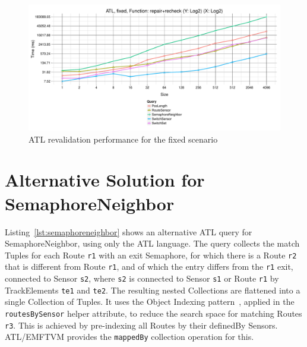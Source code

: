 \documentclass[submission,copyright,creativecommons]{eptcs}
\begin{document}
\begin{figure}[ht]
\centerline{
\includegraphics[width=15cm]{figures/fixed-ATL-GroupBy-Query-time-revalidation}}
\caption{ATL revalidation performance for the fixed scenario}
\label{fig:atl-recheck-performance}
\end{figure}


\appendix

\section{Alternative Solution for SemaphoreNeighbor}
\label{appendix:a}

Listing~\ref{lst:semaphoreneighbor} shows an alternative ATL query for SemaphoreNeighbor, using only the ATL language. The query collects the match Tuples for each Route \texttt{r1} with an exit Semaphore, for which there is a Route \texttt{r2} that is different from Route \texttt{r1}, and of which the entry differs from the \texttt{r1} exit, connected to Sensor \texttt{s2}, where \texttt{s2} is connected to Sensor \texttt{s1} or Route \texttt{r1} by TrackElements \texttt{te1} and \texttt{te2}. The resulting nested Collections are flattened into a single Collection of Tuples. It uses the Object Indexing pattern~\cite{conf/icsea/Lano2011}, applied in the \texttt{routesBySensor} helper attribute, to reduce the search space for matching Routes \texttt{r3}. This is achieved by pre-indexing all Routes by their definedBy Sensors. ATL/EMFTVM provides the \texttt{mappedBy} collection operation for this.
\end{document}
